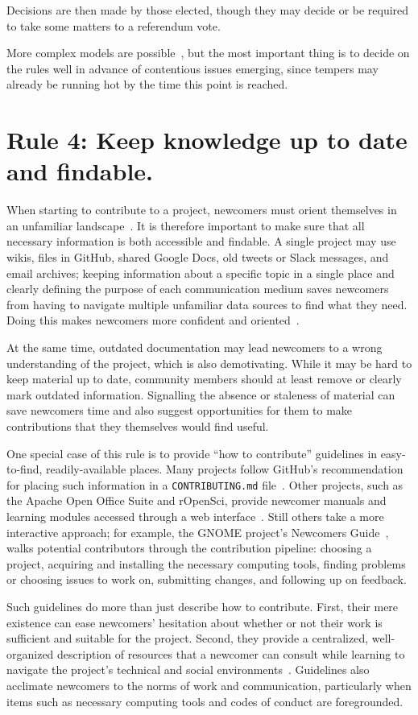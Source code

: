 \documentclass[10pt,letterpaper]{article}
\newcommand{\rulemajor}[1]{\section*{#1}}
\begin{document}
\noindent
Decisions are then made by those elected,
though they may decide or be required to take some matters to a referendum vote.

More complex models are possible~\cite{apache-governance},
but the most important thing is to decide on the rules well in advance of contentious issues emerging,
since tempers may already be running hot by the time this point is reached.

\rulemajor{Rule 4: Keep knowledge up to date and findable.}

When starting to contribute to a project,
newcomers must orient themselves in an unfamiliar landscape~\cite{dagenais2010}.
It is therefore important to make sure that all necessary information is both accessible and findable.
A single project may use wikis, files in GitHub, shared Google Docs, old tweets or Slack messages, and email archives;
keeping information about a specific topic in a single place
and clearly defining the purpose of each communication medium
saves newcomers from having to navigate multiple unfamiliar data sources to find what they need.
Doing this makes newcomers more confident and oriented~\cite{steinmacher2016}.

At the same time,
outdated documentation may lead newcomers to a wrong understanding of the project,
which is also demotivating.
While it may be hard to keep material up to date,
community members should at least remove or clearly mark outdated information.
Signalling the absence or staleness of material can save newcomers time
and also suggest opportunities for them to make contributions that they themselves would find useful.

One special case of this rule is to provide ``how to contribute'' guidelines in easy-to-find, readily-available places.
Many projects follow GitHub's recommendation for placing such information in a \texttt{CONTRIBUTING.md} file~\cite{github-rec}.
Other projects,
such as the Apache Open Office Suite and rOpenSci,
provide newcomer manuals and learning modules accessed through a web interface~\cite{apache-guidelines,ropensci-guidelines}.
Still others take a more interactive approach;
for example,
the GNOME project's Newcomers Guide~\cite{gnome-newcomers}, walks potential contributors through the contribution pipeline:
choosing a project,
acquiring and installing the necessary computing tools,
finding problems or choosing issues to work on,
submitting changes,
and following up on feedback.

Such guidelines do more than just describe how to contribute.
First,
their mere existence can ease newcomers' hesitation
about whether or not their work is sufficient and suitable for the project.
Second,
they provide a centralized, well-organized description of resources
that a newcomer can consult while learning to navigate the project's technical and social environments~\cite{zanatta2017}.
Guidelines also acclimate newcomers to the norms of work and communication,
particularly when items such as necessary computing tools and codes of conduct are foregrounded.
\end{document}
